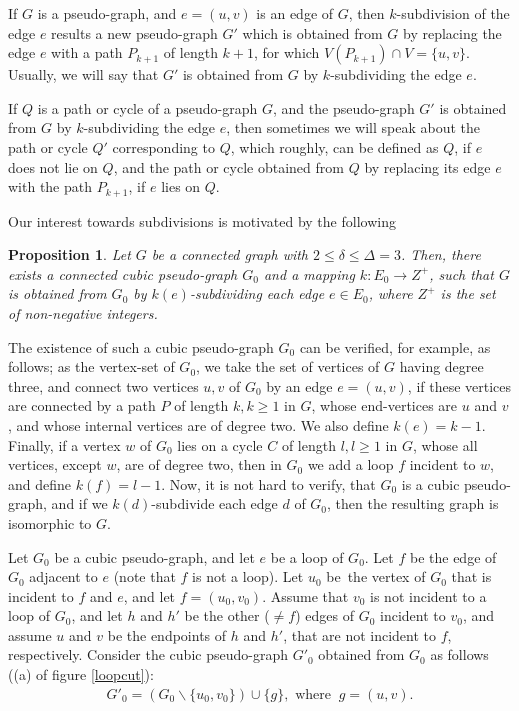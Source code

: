 \documentclass[fleqn,12pt,twoside]{article}
\newtheorem{proposition}{Proposition}
\newenvironment{proof}[1][Proof.]{\begin{trivlist}
\item[\hskip \labelsep {\bfseries #1}]}{\end{trivlist}}
\begin{document}
If $G$ is a pseudo-graph, and $e=(u,v)$ is an edge of $G$, then $k$-subdivision of the edge $e$ results a new pseudo-graph $G'$ which
is obtained from $G$ by replacing the edge $e$ with a path $P_{k+1}$
of length $k+1$, for which $V(P_{k+1})\cap V=\{u,v\}$. Usually, we
will say that $G'$ is obtained from $G$ by $k$-subdividing the edge
$e$.

If $Q$ is a path or cycle of a pseudo-graph $G$, and the pseudo-graph $G'$ is obtained from $G$ by $k$-subdividing the edge $e$, then
sometimes we will speak about the path or cycle $Q'$ corresponding
to $Q$, which roughly, can be defined as $Q$, if $e$ does not lie on
$Q$, and
the path or cycle obtained from $Q$ by replacing its edge $e$ with the path $P_{k+1}$, if $e$ lies on $Q$.

Our interest towards subdivisions is motivated by the following

\begin{proposition}
\label{CubicPseudoGraph}Let $G$ be a connected graph with $2\leq
\delta
\leq \Delta =3$. Then, there exists a connected cubic pseudo-graph $G_{0}$ and a mapping $k:E_{0}\rightarrow Z^{+}$, such that $G$ is
obtained from $G_{0}$ by $k(e)$-subdividing each edge $e\in E_{0}$,
where $Z^{+}$ is the set of non-negative integers.
\end{proposition}
\begin{proof}The existence of such a cubic pseudo-graph $G_{0}$ can be verified,
for example, as follows; as the vertex-set of $G_0$, we take the set
of vertices of $G$ having degree three, and connect two vertices
$u,v$ of $G_0$ by an edge $e=(u,v)$, if these vertices are connected
by a path $P$ of length $k,k\geq1$ in $G$, whose end-vertices are
$u$ and $v$, and whose internal vertices are of degree two. We also
define $k(e)=k-1$. Finally, if a vertex $w$ of $G_0$ lies on a cycle
$C$ of length $l,l\geq1$ in $G$, whose all vertices, except $w$, are
of degree two, then in $G_0$ we add a loop $f$ incident to $w$, and
define $k(f)=l-1$. Now, it is not hard to verify, that $G_0$ is a
cubic pseudo-graph, and if we $k(d)$-subdivide each edge $d$ of
$G_0$, then the resulting graph is isomorphic to $G$.
\end{proof}

Let $G_{0}$ be a cubic pseudo-graph, and let $e$ be a loop of $G_{0}$. Let $f $ be the edge of $G_{0}$ adjacent to $e$ (note that $f$ is not a
loop). Let $u_{0}$ be\ the vertex of $G_{0}$ that is incident to $f$
and $e$, and
let $f=(u_{0},v_{0})$. Assume that $v_{0}$ is not incident to a loop of $G_{0}$, and let $h$ and $h'$ be the other ($\neq f$) edges of $G_{0} $ incident to $v_{0}$, and assume $u$ and $v$ be the endpoints
of $h$ and $h'$, that are not incident to $f$, respectively.
Consider the cubic pseudo-graph $G'_{0}$ obtained from $G_{0}$ as
follows ((a)
of figure \ref{loopcut}):\begin{eqnarray*}
G'_{0}=(G_{0}\backslash \{u_{0},v_{0}\})\cup \{g\},\text{ where } \
g=(u,v).
\end{eqnarray*}
\end{document}
